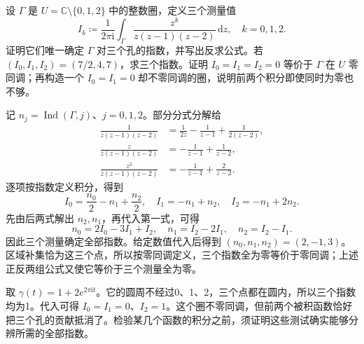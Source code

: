 \begin{exercise}\label{b3:ex:10-5}
设 \(\Gamma\) 是 \(U=\mathbb C\setminus\{0,1,2\}\) 中的整数圈，定义三个测量值
\[
 I_k\coloneqq\frac1{2\pi\mathrm i}\int_\Gamma
       \frac{z^k}{z(z-1)(z-2)}\,\mathrm dz,
 \quad k=0,1,2.
\]
证明它们唯一确定 \(\Gamma\) 对三个孔的指数，并写出反求公式。若 \((I_0,I_1,I_2)=(7/2,4,7)\)，求三个指数。证明 \(I_0=I_1=I_2=0\) 等价于 \(\Gamma\) 在 \(U\) 零同调；再构造一个 \(I_0=I_1=0\) 却不零同调的圈，说明前两个积分即使同时为零也不够。
\end{exercise}
\begin{solution}
记 \(n_j=\operatorname{Ind}(\Gamma,j)\)、\(j=0,1,2\)。部分分式分解给
\[
 \begin{aligned}
 \frac1{z(z-1)(z-2)}
 &=\frac1{2z}-\frac1{z-1}+\frac1{2(z-2)},\\
 \frac{z}{z(z-1)(z-2)}
 &=-\frac1{z-1}+\frac1{z-2},\\
 \frac{z^2}{z(z-1)(z-2)}
 &=-\frac1{z-1}+\frac2{z-2}.
 \end{aligned}
\]
逐项按指数定义积分，得到
\[
 I_0=\frac{n_0}{2}-n_1+\frac{n_2}{2},\quad
 I_1=-n_1+n_2,\quad I_2=-n_1+2n_2.
\]
先由后两式解出 \(n_2,n_1\)，再代入第一式，可得
\[
 n_0=2I_0-3I_1+I_2,\quad
 n_1=I_2-2I_1,\quad n_2=I_2-I_1.
\]
因此三个测量确定全部指数。给定数值代入后得到 \((n_0,n_1,n_2)=(2,-1,3)\)。区域补集恰为这三个点，所以按零同调定义，三个指数全为零等价于零同调；上述正反两组公式又使它等价于三个测量全为零。

取 \(\gamma(t)=1+2e^{2\pi\mathrm i t}\)。它的圆周不经过0、1、2，三个点都在圆内，所以三个指数均为1。代入可得 \(I_0=I_1=0\)、\(I_2=1\)。这个圈不零同调，但前两个被积函数恰好把三个孔的贡献抵消了。检验某几个函数的积分之前，须证明这些测试确实能够分辨所需的全部指数。
\end{solution}

